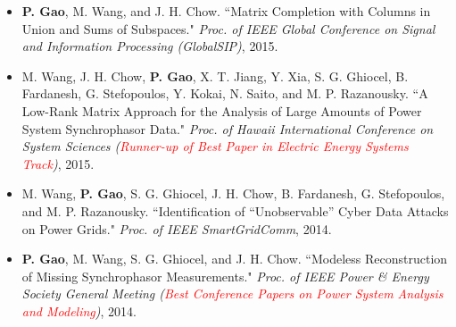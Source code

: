 \documentclass{resume}
\begin{document}
\begin{itemize}[parsep=0.2ex]
\item {{\bf P. Gao}, M. Wang, and J. H. Chow. ``Matrix Completion with Columns in Union and Sums of Subspaces." \emph{Proc. of IEEE Global Conference on Signal and Information Processing (GlobalSIP)}, 2015.}

\item {M. Wang, J. H. Chow, {\bf P. Gao}, X. T. Jiang, Y. Xia, S. G. Ghiocel, B. Fardanesh, G. Stefopoulos, Y. Kokai, N. Saito, and M. P. Razanousky. ``A Low-Rank Matrix Approach for the Analysis of Large Amounts of Power System Synchrophasor Data." \emph{Proc. of Hawaii International Conference on System Sciences (\textcolor{red}{Runner-up of Best Paper in Electric Energy Systems Track})}, 2015.}

\item {M. Wang, {\bf P. Gao}, S. G. Ghiocel, J. H. Chow, B. Fardanesh, G. Stefopoulos, and M. P. Razanousky. ``Identification of ``Unobservable'' Cyber Data Attacks on Power Grids." \emph{Proc. of IEEE SmartGridComm}, 2014.}

\item {{\bf P. Gao}, M. Wang, S. G. Ghiocel, and J. H. Chow. ``Modeless Reconstruction of Missing Synchrophasor Measurements." \emph{Proc. of IEEE Power \& Energy Society General Meeting (\textcolor{red}{Best Conference Papers on Power System Analysis and Modeling})}, 2014.}
\end{itemize}

\

\iffalse
\end{document}
